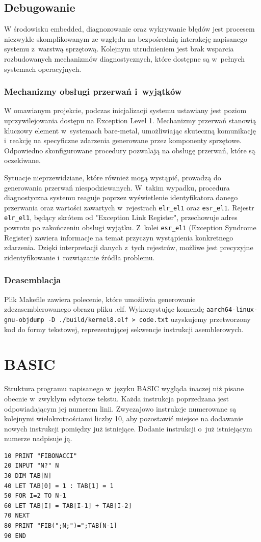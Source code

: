 \documentclass[shortabstract]{iithesis}
\begin{document}
\section{Debugowanie}
W środowisku embedded, diagnozowanie oraz wykrywanie błędów jest procesem niezwykle skomplikowanym ze względu na bezpośrednią interakcję napisanego systemu z~warstwą sprzętową. Kolejnym utrudnieniem jest brak wsparcia rozbudowanych mechanizmów diagnostycznych, które dostępne są w~pełnych systemach operacyjnych. 
\subsection{Mechanizmy obsługi przerwań i~wyjątków}
W omawianym projekcie, podczas inicjalizacji systemu ustawiany jest poziom uprzywilejowania dostępu na Exception Level 1. Mechanizmy przerwań stanowią kluczowy element w~systemach bare-metal, umożliwiając skuteczną komunikację i~reakcję na specyficzne zdarzenia generowane przez komponenty sprzętowe. Odpowiedno skonfigurowane procedury pozwalają na obsługę przerwań, które są oczekiwane.

Sytuacje nieprzewidziane, które również mogą wystąpić, prowadzą do generowania przerwań niespodziewanych. W~takim wypadku, procedura diagnostyczna systemu reaguje poprzez wyświetlenie identyfikatora danego przerwania oraz wartości zawartych w~rejestrach \texttt{elr\_el1} oraz \texttt{esr\_el1}. Rejestr \texttt{elr\_el1}, będący skrótem od "Exception Link Register", przechowuje adres powrotu po zakończeniu obsługi wyjątku. Z~kolei \texttt{esr\_el1} (Exception Syndrome Register) zawiera informacje na temat przyczyn wystąpienia konkretnego zdarzenia. Dzięki interpretacji danych z~tych rejestrów, możliwe jest precyzyjne zidentyfikowanie i~rozwiązanie źródła problemu.
\subsection{Deasemblacja}
Plik Makefile zawiera polecenie, które umożliwia generowanie zdezasemblerowanego obrazu pliku .elf. Wykorzystując komendę \texttt{aarch64-linux-gnu-objdump -D ./build/kernel8.elf > code.txt} uzyskujemy przetworzony kod do formy tekstowej, reprezentującej sekwencje instrukcji asemblerowych.


\chapter{BASIC}
Struktura programu napisanego w~języku BASIC wygląda inaczej niż pisane obecnie w~zwykłym edytorze tekstu. Każda instrukcja poprzedzana jest odpowiadającym jej numerem linii. Zwyczajowo instrukcje numerowane są kolejnymi wielokrotnościami liczby 10, aby pozostawić miejsce na dodawanie nowych instrukcji pomiędzy już istniejące. Dodanie instrukcji o~już istniejącym numerze nadpisuje ją.
\begin{verbatim}
10 PRINT "FIBONACCI"
20 INPUT "N?" N
30 DIM TAB[N]
40 LET TAB[0] = 1 : TAB[1] = 1
50 FOR I=2 TO N-1
60 LET TAB[I] = TAB[I-1] + TAB[I-2]
70 NEXT
80 PRINT "FIB(";N;")=";TAB[N-1]
90 END
\end{verbatim}
\end{document}
